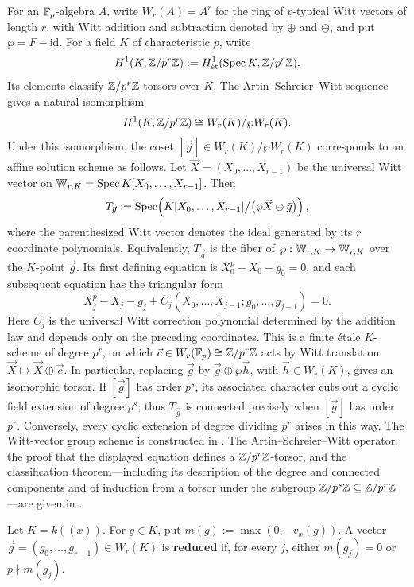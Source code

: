 For an $\mathbb{F}_p$-algebra $A$, write $W_r(A)=A^r$ for the ring of $p$-typical
Witt vectors of length $r$, with Witt addition and subtraction denoted by
$\oplus$ and $\ominus$, and put $\wp=F-\mathrm{id}$. For a field $K$ of
characteristic $p$, write
\[
H^1(K,\mathbb{Z}/p^r\mathbb{Z}):=
H^1_{\mathrm{\acute et}}(\operatorname{Spec} K,\mathbb{Z}/p^r\mathbb{Z}).
\]
Its elements classify $\mathbb{Z}/p^r\mathbb{Z}$-torsors over $K$.
The Artin--Schreier--Witt sequence gives a natural isomorphism
\[
H^1(K,\mathbb{Z}/p^r\mathbb{Z})\cong W_r(K)/\wp W_r(K).
\]
Under this isomorphism, the coset
$[\vec g]\in W_r(K)/\wp W_r(K)$ corresponds to an affine solution scheme
as follows. Let $\vec X=(X_0,\dots,X_{r-1})$ be the universal Witt vector
on $\mathbb{W}_{r,K}=\operatorname{Spec} K[X_0,\dots,X_{r-1}]$. Then
\[
T_{\vec g}:=
\operatorname{Spec}\!\left(
K[X_0,\dots,X_{r-1}]
\big/\bigl(\wp\vec X\ominus\vec g\bigr)
\right),
\]
where the parenthesized Witt vector denotes the ideal generated by its $r$
coordinate polynomials. Equivalently, $T_{\vec g}$ is the fiber of
$\wp:\mathbb{W}_{r,K}\to\mathbb{W}_{r,K}$ over the $K$-point $\vec g$. Its first defining
equation is $X_0^p-X_0-g_0=0$, and each subsequent equation has the
triangular form
\[
X_j^p-X_j-g_j+
C_j(X_0,\dots,X_{j-1};g_0,\dots,g_{j-1})=0.
\]
Here $C_j$ is the universal Witt correction polynomial determined by the
addition law and depends only on the preceding coordinates. This is a finite
\'etale $K$-scheme of degree $p^r$, on which
$\vec c\in W_r(\mathbb{F}_p)\cong\mathbb{Z}/p^r\mathbb{Z}$ acts by Witt translation
$\vec X\mapsto\vec X\oplus\vec c$. In particular, replacing $\vec g$ by
$\vec g\oplus\wp\vec h$, with $\vec h\in W_r(K)$, gives an isomorphic
torsor. If $[\vec g]$ has order $p^s$, its associated character cuts out a
cyclic field extension of degree $p^s$; thus $T_{\vec g}$ is connected
precisely when $[\vec g]$ has order $p^r$. Conversely, every cyclic
extension of degree dividing $p^r$ arises in this way.
The Witt-vector group scheme is constructed in
. The Artin--Schreier--Witt
operator, the proof that the displayed equation defines a
$\mathbb{Z}/p^r\mathbb{Z}$-torsor, and the classification theorem---including its description
of the degree and connected components and of induction from a torsor under the
subgroup $\mathbb{Z}/p^s\mathbb{Z}\subseteq\mathbb{Z}/p^r\mathbb{Z}$---are given in
.

\begin{definition}\label{definition:reduced_witt_vector}
Let $K=k((x))$. For $g\in K$, put
$m(g):=\max(0,-v_x(g))$. A vector
$\vec g=(g_0,\dots,g_{r-1})\in W_r(K)$ is \textbf{reduced} if, for every
$j$, either $m(g_j)=0$ or $p\nmid m(g_j)$.
\end{definition}

